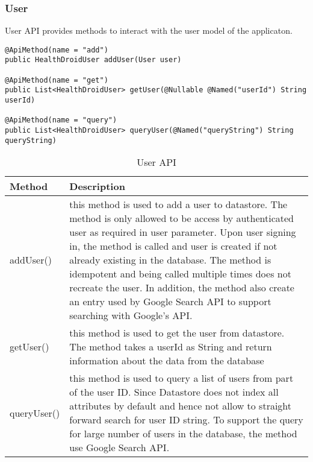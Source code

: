 \subsubsection{User}
User API provides methods to interact with the user model of the applicaton.
\begin{minipage}{\linewidth}
\begin{lstlisting}
@ApiMethod(name = "add")
public HealthDroidUser addUser(User user)

@ApiMethod(name = "get")
public List<HealthDroidUser> getUser(@Nullable @Named("userId") String userId)

@ApiMethod(name = "query")
public List<HealthDroidUser> queryUser(@Named("queryString") String queryString)
\end{lstlisting}
\end{minipage}

\begin{table}
\begin{center}
    \begin{tabularx}{\textwidth}{| l | X |}
        \hline Method & Description \\
        \hline addUser() & 
            this method is used to add a user to datastore. The method is only allowed to be access by
            authenticated user as required in user parameter. Upon user signing in, the method is called and user is
            created if not already existing in the database. The method is idempotent and being called multiple times
            does not recreate the user. In addition, the method also create an entry used by Google Search API to
            support searching with Google's API.  \\
        \hline getUser() &
            this method is used to get the user from datastore. The method takes a userId as String and return
            information about the data from the database \\
        \hline queryUser() &
            this method is used to query a list of users from part of the user ID. Since Datastore does not index all
            attributes by default and hence not allow to straight forward search for user ID string. To support the
            query for large number of users in the database, the method use Google Search API. \\
        \hline
    \end{tabularx}
\end{center}
    \caption{User API}
\end{table}

